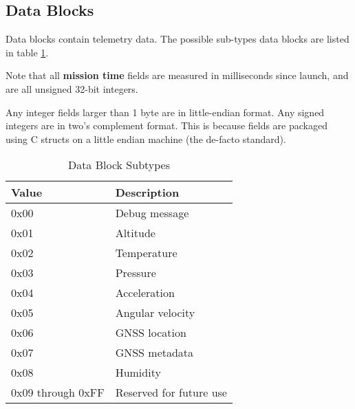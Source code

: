 \subsection{Data Blocks}

Data blocks contain telemetry data. The possible sub-types data blocks are listed in table \ref{table:data-subtypes}.

Note that all \textbf{mission time} fields are measured in milliseconds since launch, and are all unsigned 32-bit
integers.

Any integer fields larger than 1 byte are in little-endian format. Any signed integers are in two's complement format.
This is because fields are packaged using C structs on a little endian machine (the de-facto standard).

\begin{table}[H]
    \centering
    \begin{tabular}{@{}ll@{}}
        \toprule
        Value             & Description             \\
        \midrule
        0x00              & Debug message           \\
        0x01              & Altitude                \\
        0x02              & Temperature             \\
        0x03              & Pressure                \\
        0x04              & Acceleration            \\
        0x05              & Angular velocity        \\
        0x06              & GNSS location           \\
        0x07              & GNSS metadata           \\
        0x08              & Humidity                \\
        0x09 through 0xFF & Reserved for future use \\
        \bottomrule
    \end{tabular}
    \caption{Data Block Subtypes}
    \label{table:data-subtypes}
\end{table}










